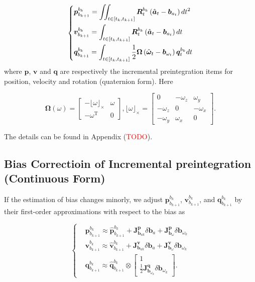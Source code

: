 \documentclass[12pt]{report}   %
\begin{document}
\begin{equation}
\centering
\left\{
\begin{aligned}
&\bm{p}_{b_{k+1}}^{b_k}=\iint_{t\in\left[t_k,t_{k+1}\right]}\bm{R}_{t}^{b_k}\left(\hat{\bm{a}}_{t}-\bm{b}_{a_t}\right)dt^2\\
&\bm{v}_{b_{k+1}}^{b_k}=\int_{t\in\left[t_k,t_{k+1}\right]}\bm{R}_{t}^{b_k}\left(\hat{\bm{a}}_{t}-\bm{b}_{a_t}\right)dt \\
&\bm{q}_{b_{k+1}}^{b_k}=\int_{t\in\left[t_k,t_{k+1}\right]}\frac{1}{2}\bm{\Omega}\left(\hat{\bm{\omega}}_t-\bm{b}_{\omega_t}\right)\bm{q}_t^{b_k}dt
\end{aligned}
\right.
\label{eq.preintegration}
\end{equation}
where $\bm{p}$, $\bm{v}$ and $\bm{q}$ are respectively the
incremental preintegration items for position, velocity and rotation (quaternion
form). Here 

\begin{equation}
\bm{\Omega}\left( \omega \right) = 
\begin{bmatrix}
	- \lfloor \omega \rfloor _ \times & \omega \\
	- \omega ^{\mathrm{T}} & 0
\end{bmatrix}, \lfloor \omega \rfloor _ \times = 
\begin{bmatrix}
	0 & - \omega_z & \omega_y \\
	- \omega_z & 0 & - \omega_x \\
	- \omega_y & \omega_x & 0
\end{bmatrix}.
\label{eq.rot_incremental}
\end{equation}

The details can be found in Appendix (\textcolor{red}{TODO}).


\subsection{Bias Correctioin of Incremental preintegration (Continuous Form)}

If the estimation of bias changes minorly, we adjust $\bm{p}_{b_{k+1}}^{b_k}$, $\bm{v}_{b_{k+1}}^{b_k}$, and $\bm{q}_{b_{k+1}}^{b_k}$ by their first-order approximations with respect to the bias as

\begin{equation}
\left\{
\begin{aligned}
&\bm{p}_{b_{k+1}}^{b_k}\approx\hat{\bm{p}}_{b_{k+1}}^{b_k}+\bm{J}^{\bm{p}}_{\bm{b}_{ak}}\delta\bm{b}_a+\bm{J}^{\bm{p}}_{\bm{b}_\omega}\delta\bm{b}_{\omega_k} \\
&\bm{v}_{b_{k+1}}^{b_k}\approx\hat{\bm{v}}_{b_{k+1}}^{b_k}+\bm{J}^{\bm{v}}_{\bm{b}_{ak}}\delta\bm{b}_a+\bm{J}^{\bm{v}}_{\bm{b}_\omega}\delta\bm{b}_{\omega_k} \\
&\bm{q}_{b_{k+1}}^{b_k}\approx\hat{\bm{q}}_{b_{k+1}}^{b_k}\otimes 
	\begin{bmatrix}
		1 \\ \frac{1}{2}\bm{J}^{\bm{q}}_{\bm{b}_{\omega_k}}\delta\bm{b}_{\omega_k}
	\end{bmatrix}.
\end{aligned}
\right.
\label{eq.bias_correction}
\end{equation}
\end{document}
